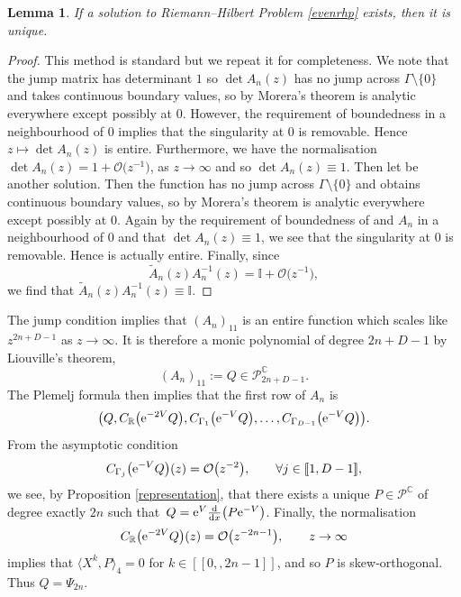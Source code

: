 \documentclass[pdftex]{sigma}
\numberwithin{equation}{section}
\newtheorem{Lemma}[Theorem]{Lemma}
\begin{document}
\begin{Lemma}\label{uniqueness} If a solution to Riemann--Hilbert Problem {\rm \ref{evenrhp}} exists, then it is unique.
\end{Lemma}
\begin{proof}
This method is standard but we repeat it for completeness. We note that the jump matrix has determinant $1$ so $\det A_{n}(z) $ has no jump across $\Gamma \setminus \{ 0 \}$ and takes continuous boundary values, so by Morera's theorem is analytic everywhere except possibly at $0$. However, the requirement of boundedness in a neighbourhood of $0$ implies that the singularity at $0$ is removable. Hence $z \mapsto \det A_{n}(z)$ is entire. Furthermore, we have the normalisation
$\det A_{n}(z) = 1 + \mathcal{O}\big(z^{-1}\big)$,
 as $z \to \infty$ and so $\det A_{n}(z) \equiv 1$.
Then let  be another solution. Then the function 
has no jump across $\Gamma \setminus \{0 \}$ and obtains continuous boundary values, so by Morera's theorem is analytic everywhere except possibly at $0$. Again by the requirement of boundedness of  and $A_n$ in a neighbourhood of $0$ and that $\det A_n(z) \equiv 1$, we see that the singularity at $0$ is removable. Hence  is actually entire. Finally, since
\begin{equation*}
\tilde{A}_{n}(z) A_{n}^{-1}(z) = \mathbb{I}+\mathcal{O}\big(z^{-1}\big),
\end{equation*}
we find that $\tilde{A}_{n}(z) A_{n}^{-1}(z) \equiv \mathbb{I}$.
\end{proof}

The jump condition implies that $(A_{n})_{11}$ is an entire function which scales like $z^{2n+D-1}$ as $z \to \infty$. It is therefore a monic polynomial of degree $2n+D-1$ by Liouville's theorem,
\begin{equation*}
(A_{n})_{11} := Q \in \mathscr{P}_{2n+D-1}^\mathbb{C}.
\end{equation*}
The Plemelj formula then implies that the first row of $A_{n}$ is
\begin{equation*}
\big( Q , C_{\mathbb{R}}\big({\rm e}^{-2V} Q\big) , C_{\Gamma_1}\big({\rm e}^{-V} Q\big) , \dots , C_{\Gamma_{D-1}}\big({\rm e}^{-V} Q\big)\big).
\end{equation*}
 From the asymptotic condition
 \begin{align*}
 C_{\Gamma_j}\big({\rm e}^{-V} Q\big)(z) = \mathcal{O}\big(z^{-2}\big),\qquad \forall j \in [\![ 1,D-1]\!],
 \end{align*}
we see, by Proposition \ref{representation}, that there exists a unique $P \in \mathscr{P}^\mathbb{C}$ of degree exactly $2n$ such that~${Q = {\rm e}^{V} \frac{\rm d}{{\rm d}x}\big(P {\rm e}^{-V}\big)}$. Finally, the normalisation
\begin{align*}
C_{\mathbb{R}}\big({\rm e}^{-2V} Q\big)(z) = \mathcal{O}\big(z^{-2n-1}\big) ,\qquad z \to \infty
\end{align*}
implies that $\langle \mathit{X}^k , P\rangle_4 =0 $ for $k \in [\![0, , 2n-1]\!]$, and so $P$ is skew-orthogonal. Thus $Q = \Psi_{2n}$.
\end{document}
